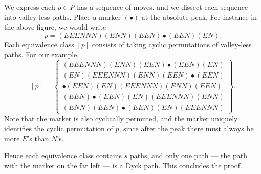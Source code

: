We express each $p\in P$ has a sequence of moves, and we dissect each sequence into valley-less paths. Place a marker $(\bullet)$ at the absolute peak. For instance in the above figure, we would write \[p=(EEENNN)(ENN)(EEN)\bullet(EEN)(EN).\]
Each equivalence class $[p]$ consists of taking cyclic permutations of valley-less paths. For our example, \[ [p]=\begin{Bmatrix}(EEENNN)(ENN)(EEN)\bullet(EEN)(EN)\\ (EN)(EEENNN)(ENN)(EEN)\bullet(EEN)\\ \bullet(EEN)(EN)(EEENNN)(ENN)(EEN)\\ (EEN)\bullet(EEN)(EN)(EEENNN)(ENN)\\ (ENN)(EEN)\bullet(EEN)(EN)(EEENNN)\end{Bmatrix}.\]
Note that the marker is also cyclically permuted, and the marker uniquely identifies the cyclic permutation of $p$, since after the peak there must always be more $E$'s than $N$'s.

Hence each equivalence class contains $s$ paths, and only one path --- the path with the marker on the far left --- is a Dyck path. This concludes the proof.

